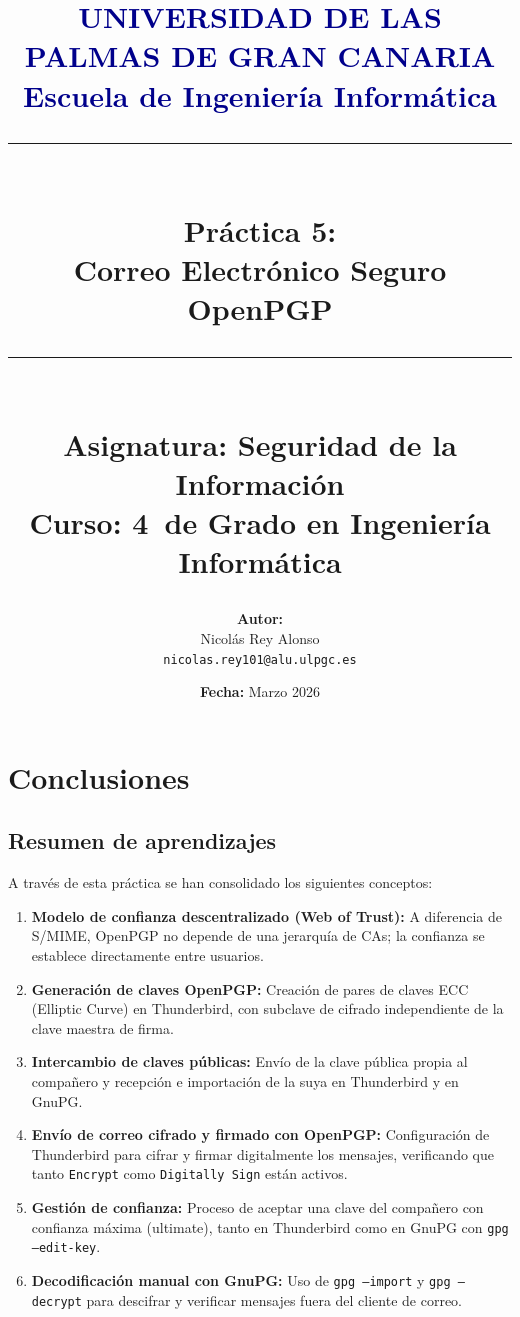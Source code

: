 \documentclass[12pt,a4paper]{report}
\title{
    \vspace*{-2cm}
    {\Large \textcolor{darkblue}{\textbf{UNIVERSIDAD DE LAS PALMAS DE GRAN CANARIA}}}\\
    {\Large \textcolor{darkblue}{\textbf{Escuela de Ingeniería Informática}}}\\
    \vspace{1cm}
    {\rule{\textwidth}{2pt}}\\
    \vspace{0.5cm}
    {\LARGE \textbf{Práctica 5:}}\\
    {\LARGE \textbf{Correo Electrónico Seguro OpenPGP}}\\
    \vspace{0.5cm}
    {\rule{\textwidth}{2pt}}\\
    \vspace{1cm}
    {\large \textbf{Asignatura:} Seguridad de la Información}\\
    {\large \textbf{Curso:} 4\textdegree\ de Grado en Ingeniería Informática}\\
    \vspace{1.5cm}
}
\author{
    \textbf{Autor:} \\
    Nicolás Rey Alonso\\
    \texttt{nicolas.rey101@alu.ulpgc.es}\\
}
\date{
    \vspace{1cm}
    \textbf{Fecha:} Marzo 2026
}
\begin{document}
\maketitle
\thispagestyle{firststyle}








\chapter{Conclusiones}

\section{Resumen de aprendizajes}

A través de esta práctica se han consolidado los siguientes conceptos:

\begin{enumerate}
    \item \textbf{Modelo de confianza descentralizado (Web of Trust):} A diferencia de S/MIME, OpenPGP no depende de una jerarquía de CAs; la confianza se establece directamente entre usuarios.
    \item \textbf{Generación de claves OpenPGP:} Creación de pares de claves ECC (Elliptic Curve) en Thunderbird, con subclave de cifrado independiente de la clave maestra de firma.
    \item \textbf{Intercambio de claves públicas:} Envío de la clave pública propia al compañero y recepción e importación de la suya en Thunderbird y en GnuPG.
    \item \textbf{Envío de correo cifrado y firmado con OpenPGP:} Configuración de Thunderbird para cifrar y firmar digitalmente los mensajes, verificando que tanto \texttt{Encrypt} como \texttt{Digitally Sign} están activos.
    \item \textbf{Gestión de confianza:} Proceso de aceptar una clave del compañero con confianza máxima (ultimate), tanto en Thunderbird como en GnuPG con \texttt{gpg --edit-key}.
    \item \textbf{Decodificación manual con GnuPG:} Uso de \texttt{gpg --import} y \texttt{gpg --decrypt} para descifrar y verificar mensajes fuera del cliente de correo.
\end{enumerate}
\end{document}
